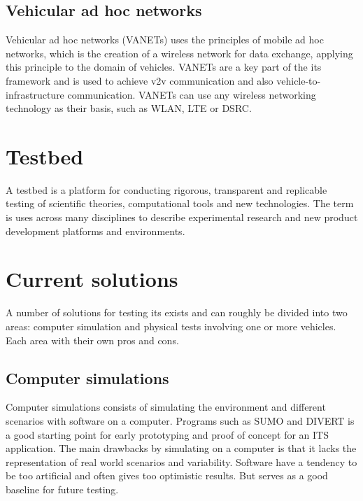 
\subsection{Vehicular ad hoc networks}\label{sec:vanet}
Vehicular ad hoc networks (VANETs) uses the principles of mobile ad hoc networks, which is the creation of a wireless network for data exchange, applying this principle to the domain of vehicles. VANETs are a key part of the \gls{its} framework and is used to achieve \gls{v2v} communication and also vehicle-to-infrastructure communication. VANETs can use any wireless networking technology as their basis, such as WLAN, LTE or DSRC. 

\section{Testbed}\label{sec:testbed}
A testbed is a platform for conducting rigorous, transparent and replicable testing of scientific theories, computational tools and new technologies. The term is uses across many disciplines to describe experimental research and new product development platforms and environments. 

\section{Current solutions}
A number of solutions for testing \gls{its} exists and can roughly be divided into two areas: computer simulation and physical tests involving one or more vehicles. Each area with their own pros and cons. 

\subsection{Computer simulations}\label{subsec:computer-simulation}
Computer simulations consists of simulating the environment and different scenarios with software on a computer. Programs such as SUMO and DIVERT is a good starting point for early prototyping and proof of concept for an ITS application. The main drawbacks by simulating on a computer is that it lacks the representation of real world scenarios and variability. Software have a tendency to be too artificial and often gives too optimistic results. But serves as a good baseline for future testing. 

